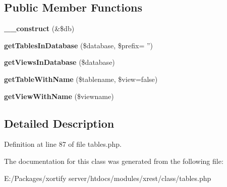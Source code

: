 \subsection*{Public Member Functions}
\begin{DoxyCompactItemize}
\item 
\hypertarget{class_xrest_tables_handler_aaf2ef772755ec6f361d44e16cc9ffd69}{{\bfseries \-\_\-\-\_\-construct} (\&\$db)}\label{class_xrest_tables_handler_aaf2ef772755ec6f361d44e16cc9ffd69}

\item 
\hypertarget{class_xrest_tables_handler_a215b6093ef0417b605eceaafe1809466}{{\bfseries get\-Tables\-In\-Database} (\$database, \$prefix= '')}\label{class_xrest_tables_handler_a215b6093ef0417b605eceaafe1809466}

\item 
\hypertarget{class_xrest_tables_handler_a79d4ecbdbc251e0403205a449e54e17a}{{\bfseries get\-Views\-In\-Database} (\$database)}\label{class_xrest_tables_handler_a79d4ecbdbc251e0403205a449e54e17a}

\item 
\hypertarget{class_xrest_tables_handler_ac8593d6077b590e06962f37de42b57bf}{{\bfseries get\-Table\-With\-Name} (\$tablename, \$view=false)}\label{class_xrest_tables_handler_ac8593d6077b590e06962f37de42b57bf}

\item 
\hypertarget{class_xrest_tables_handler_a08661c64a716c14a81115f74949699cd}{{\bfseries get\-View\-With\-Name} (\$viewname)}\label{class_xrest_tables_handler_a08661c64a716c14a81115f74949699cd}

\end{DoxyCompactItemize}


\subsection{Detailed Description}


Definition at line 87 of file tables.\-php.



The documentation for this class was generated from the following file\-:\begin{DoxyCompactItemize}
\item 
E\-:/\-Packages/xortify server/htdocs/modules/xrest/class/tables.\-php\end{DoxyCompactItemize}
